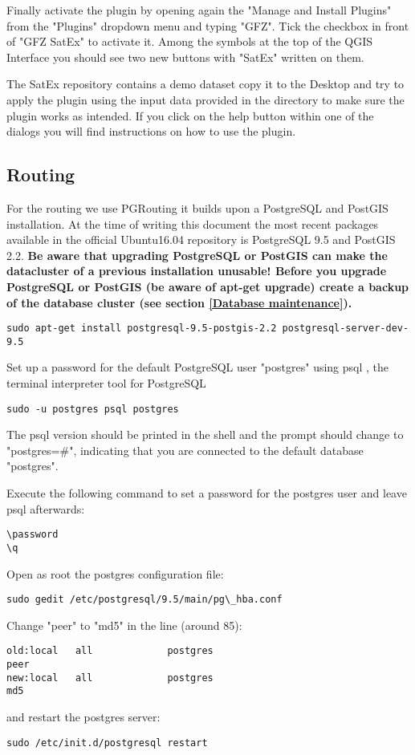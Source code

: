 \documentclass{article}
\begin{document}
Finally activate the plugin by opening again the "Manage and Install Plugins" from the "Plugins" dropdown menu and typing "GFZ". Tick the
checkbox in front of "GFZ SatEx" to activate it. Among the symbols
at the top of the QGIS Interface you should see two new buttons
with "SatEx" written on them.

The SatEx repository contains a demo dataset copy it to the Desktop
and try to apply the plugin using the input data provided
in the directory to make sure the plugin works as intended. If
you click on the help button within one of
the dialogs you will find instructions on how to use
the plugin.

\subsection{Routing}
For the routing we use PGRouting it builds upon a PostgreSQL and 
PostGIS installation.
 At the time
of writing this document the most recent packages available in
the official Ubuntu16.04 repository is PostgreSQL 9.5 and PostGIS 2.2.
\textbf{Be aware that upgrading PostgreSQL or PostGIS can make the 
datacluster of a previous installation unusable! Before you
upgrade PostgreSQL or PostGIS (be aware of apt-get upgrade) create a backup of the database cluster (see section \ref{Database maintenance}).}

\begin{verbatim}
sudo apt-get install postgresql-9.5-postgis-2.2 postgresql-server-dev-9.5
\end{verbatim}

Set up a password for the default PostgreSQL user "postgres" using psql
, the terminal interpreter tool for PostgreSQL
\begin{verbatim}
sudo -u postgres psql postgres
\end{verbatim}
The psql version should be printed in the shell and the 
prompt should change to "postgres=\#", indicating that you are connected
to the default database "postgres".  

Execute the following command to set a password for the postgres user
and leave psql afterwards:

\begin{verbatim}
\password
\q
\end{verbatim}

Open as root the postgres configuration file:
\begin{verbatim}
sudo gedit /etc/postgresql/9.5/main/pg\_hba.conf
\end{verbatim}
Change "peer" to "md5" in the line (around 85):
\begin{verbatim}
old:local   all             postgres                                peer
new:local   all             postgres                                md5
\end{verbatim}
and restart the postgres server:
\begin{verbatim}
sudo /etc/init.d/postgresql restart
\end{verbatim}
\end{document}
